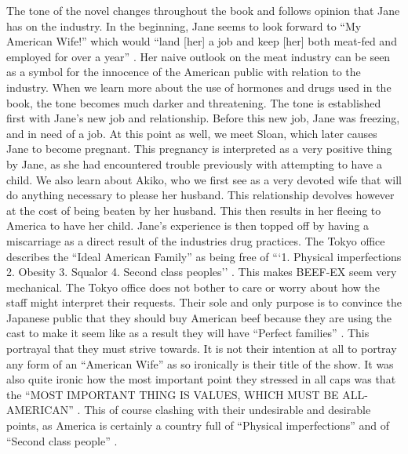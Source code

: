 \documentclass{article}
\begin{document}
%

The tone of the novel changes throughout the book and follows opinion that
Jane has on the industry. In the beginning, Jane seems to look forward to
``My American Wife!'' which would ``land [her] a job and keep [her] both
meat-fed and employed for over a year'' \cite[Ch. 1]{ozeki1998my}. Her naive
outlook on the meat industry can be seen as a symbol for the innocence of
the American public with relation to the industry. When we learn more about
the use of hormones and drugs used in the book, the tone becomes much darker
and threatening. The tone is established first with Jane's new job and
relationship. Before this new job, Jane was freezing, and in need of a job.
At this point as well, we meet Sloan, which later causes Jane to become
pregnant. This pregnancy is interpreted as a very positive thing by Jane, as
she had encountered trouble previously with attempting to have a child. We
also learn about Akiko, who we first see as a very devoted wife that will do
anything necessary to please her husband. This relationship devolves however
at the cost of being beaten by her husband. This then results in her fleeing
to America to have her child. Jane's experience is then topped off by having
a miscarriage as a direct result of the industries drug practices. The Tokyo
office describes the ``Ideal American Family'' as being free of ```1.
Physical imperfections 2. Obesity 3. Squalor 4. Second class peoples''
\cite[Ch. 1]{ozeki1998my}. This makes BEEF-EX seem very mechanical. The
Tokyo office does not bother to care or worry about how the staff might
interpret their requests. Their sole and only purpose is to convince the
Japanese public that they should buy American beef because they are using
the cast to make it seem like as a result they will have ``Perfect
families'' \cite[Ch. 1]{ozeki1998my}. This portrayal that they must strive
towards. It is not their intention at all to portray any form of an
``American Wife'' as so ironically is their title of the show. It was also
quite ironic how the most important point they stressed in all caps was that
the ``MOST IMPORTANT THING IS VALUES, WHICH MUST BE ALL-AMERICAN'' \cite[Ch.
1]{ozeki1998my}. This of course clashing with their undesirable and
desirable points, as America is certainly a country full of ``Physical
imperfections'' and of ``Second class people'' \cite[Ch. 1]{ozeki1998my}.

\end{document}
